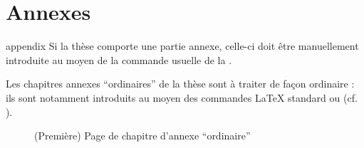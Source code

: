 \chapter{Annexes}\label{cha-annexes}
%

\begin{docCommand}{appendix}{}
  Si la thèse comporte une partie annexe, celle-ci doit être manuellement
  introduite au moyen de la commande usuelle  de la
  \nofrontmatter.
\end{docCommand}

Les chapitres annexes \enquote{ordinaires} de la thèse sont à traiter de façon
ordinaire : ils sont notamment introduits au moyen des commandes \LaTeX{}
standard  ou  (cf.
).

\begin{figure}[htbp]
  \centering
  \caption[Chapitre d'annexe \enquote{ordinaire}]{(Première) Page de chapitre
    d'annexe \enquote{ordinaire}}
  \label{fig-appendix}
\end{figure}

